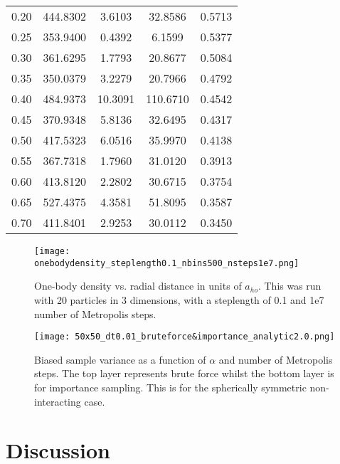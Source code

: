 \documentclass[
    a4paper, aps, twocolumn, floatfix, superscriptaddress,
    nofootinbib]{revtex4-1}
\begin{document}
\begin{table}[H]
{\begin{ruledtabular}
\begin{tabular}{ccccc}
0.20     & 444.8302 & 3.6103   & 32.8586    & 0.5713      \\
0.25     & 353.9400 & 0.4392   & 6.1599     & 0.5377      \\
0.30     & 361.6295 & 1.7793   & 20.8677    & 0.5084      \\
0.35     & 350.0379 & 3.2279   & 20.7966    & 0.4792      \\
0.40     & 484.9373 & 10.3091  & 110.6710   & 0.4542      \\
0.45     & 370.9348 & 5.8136   & 32.6495    & 0.4317      \\
0.50     & 417.5323 & 6.0516   & 35.9970    & 0.4138      \\
0.55     & 367.7318 & 1.7960   & 31.0120    & 0.3913      \\
0.60     & 413.8120 & 2.2802   & 30.6715    & 0.3754      \\
0.65     & 527.4375 & 4.3581   & 51.8095    & 0.3587      \\
0.70     & 411.8401 & 2.9253   & 30.0112    & 0.3450     \\
\end{tabular}
\end{ruledtabular}
}
\end{table}

\begin{figure}[H]
    \centering
    \texttt{[image: onebodydensity\_steplength0.1\_nbins500\_nsteps1e7.png]}
    \caption{One-body density vs. radial distance in units of $a_{ho}$. This was run with 20 particles in 3 dimensions, with a steplength of 0.1 and 1e7 number of Metropolis steps.}
    \label{fig:g_onebody_density}
\end{figure}

\begin{figure}[H]
    \centering
    \texttt{[image: 50x50\_dt0.01\_bruteforce\&importance\_analytic2.0.png]}
    \caption{Biased sample variance as a function of $\alpha$ and number of Metropolis steps. The top layer represents brute force whilst the bottom layer is for importance sampling. This is for the spherically symmetric non-interacting case. }
    \label{fig:blocking_behaviour}
\end{figure}


\section{Discussion}
\end{document}
